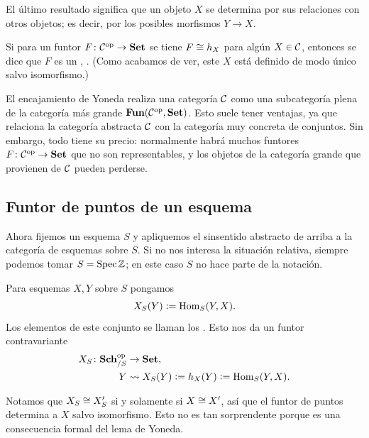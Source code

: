 \documentclass{article}
\numberwithin{equation}{section}
\theoremstyle{definition}
\begin{document}
El último resultado significa que un objeto $X$ se determina por sus relaciones
con otros objetos; es decir, por los posibles morfismos $Y \to X$.

\begin{definicion}
  Si para un funtor $F\colon \mathcal{C}^\mathrm{op} \to \text{\bf Set}$ se tiene
  $F \cong h_X$ para algún $X \in \mathcal{C}$, entonces se dice que $F$ es
  un , . (Como acabamos de
  ver, este $X$ está definido de modo único salvo isomorfismo.)
\end{definicion}

El encajamiento de Yoneda realiza una categoría $\mathcal{C}$ como
una subcategoría plena de la categoría más grande
$\text{\bf Fun} (\mathcal{C}^\mathrm{op}, \text{\bf Set})$. Esto suele tener ventajas,
ya que relaciona la categoría abstracta $\mathcal{C}$ con la categoría muy
concreta de conjuntos. Sin embargo, todo tiene su precio: normalmente habrá
muchos funtores $F\colon \mathcal{C}^\mathrm{op} \to \text{\bf Set}$ que no son
representables, y los objetos de la categoría grande que provienen
de $\mathcal{C}$ pueden perderse.

\subsection{Funtor de puntos de un esquema}

Ahora fijemos un esquema $S$ y apliquemos el sinsentido abstracto de arriba
a la categoría de esquemas sobre $S$. Si no nos interesa la situación relativa,
siempre podemos tomar $S = \operatorname{Spec} \mathbb{Z}$; en este caso $S$ no hace parte
de la notación.

\begin{definicion}
  \label{dfn:funtor-de-puntos}
  Para esquemas $X,Y$ sobre $S$ pongamos
  $$X_S (Y) \mathrel{\mathop:}= \operatorname{Hom}_S (Y,X).$$
  Los elementos de este conjunto se llaman los . Esto
  nos da un funtor contravariante
  \begin{align*}
    X_S\colon \text{\bf Sch}_{/S}^\mathrm{op} & \to \text{\bf Set},\\
    Y & \rightsquigarrow X_S (Y) \mathrel{\mathop:}= h_X (Y) \mathrel{\mathop:}= \operatorname{Hom}_S (Y,X).
  \end{align*}
\end{definicion}

Notamos que $X_S \cong X'_S$ si y solamente si $X \cong X'$, así que el funtor
de puntos determina a $X$ salvo isomorfismo. Esto no es tan sorprendente porque
es una consecuencia formal del lema de Yoneda.
\end{document}
